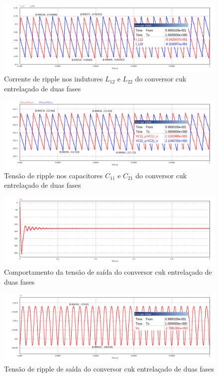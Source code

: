 \documentclass[
	12pt,				%
	openright,			%
	onseside,
	a4paper,			%
	english,			%
	french,				%
	spanish,			%
	brazil,				%
	]{abntex2}
\begin{document}
\vspace{-10pt}
\begin{figure}[htbp]%
	\captionsetup{justification=centering}
	\centering
		\includegraphics[width=0.8 \linewidth]{cuk_inter_ripp_I_LX2}
		\caption{Corrente de ripple nos indutores $L_{12}$ e $L_{22}$ do conversor cuk entrelaçado de duas fases}
		\label{fig:cuk_inter_ripp_I_L2}
\end{figure}

\begin{figure}[htbp]%
	\captionsetup{justification=centering}
	\centering
		\includegraphics[width=0.8 \linewidth]{cuk_inter_ripp_V_CX1}
		\caption{Tensão de ripple nos capacitores $C_{11}$ e $C_{21}$ do conversor cuk entrelaçado de duas fases}
		\label{fig:cuk_inter_ripp_V_C1}
\end{figure}

\begin{figure}[htbp]%
	\captionsetup{justification=centering}
	\centering
		\includegraphics[width=0.8 \linewidth]{cuk_inter_V_out}
		\caption{Comportamento da tensão de saída do conversor cuk entrelaçado de duas fases}
		\label{fig:cuk_inter_ripp_V_out}
\end{figure}

\begin{figure}[htbp]%
	\captionsetup{justification=centering}
	\centering
		\includegraphics[width=0.8 \linewidth]{cuk_inter_ripp_V_out}
		\caption{Tensão de ripple de saída do conversor cuk entrelaçado de duas fases}
		\label{fig:cuk_inter_ripp_V_out}
\end{figure}
\end{document}
